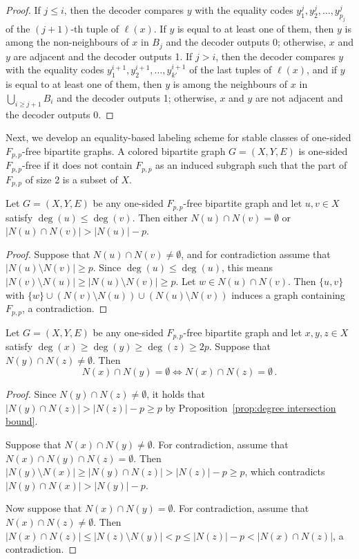 \documentclass{article}
\begin{document}
\begin{proof}
	If $j \leq i$, then the decoder compares $y$ with the equality codes $y^j_1, y^j_2, \ldots, y^j_{p_j}$ of the $(j+1)$-th tuple of $\ell(x)$. If $y$ is equal to at least one of them, then $y$ is among the non-neighbours of $x$ in $B_j$ and the decoder outputs 0; otherwise, $x$ and $y$ are adjacent and the decoder outputs 1.
	If $j > i$, then the decoder compares $y$ with the equality codes $y^{i+1}_1, y^{i+1}_2, \ldots, y^{i+1}_{k'}$ of the last tuples of $\ell(x)$, and
	if $y$ is equal to at least one of them, then $y$ is among the neighbours of $x$ in 
	$\bigcup_{i \geq j+1} B_i$ and the decoder outputs 1; otherwise, $x$ and $y$ are not adjacent and 
	the decoder outputs 0.
\end{proof}


\medskip
\noindent
Next, we develop an equality-based labeling scheme for stable classes of one-sided $F_{p,p}$-free bipartite graphs.
A colored bipartite graph $G = (X,Y,E)$ is one-sided $F_{p,p}$-free if it does not contain $F_{p,p}$
as an induced subgraph such that the part of $F_{p,p}$ of size 2 is a subset of $X$.

\begin{proposition}
\label{prop:degree intersection bound}
Let $G = (X,Y,E)$ be any one-sided $F_{p,p}$-free bipartite graph and let $u,v \in X$ satisfy $\deg(u) \leq \deg(v)$. Then either $N(u) \cap N(v) = \emptyset$ or $|N(u) \cap N(v)| > |N(u)|-p$.
\end{proposition}
\begin{proof}
Suppose that $N(u) \cap N(v) \neq \emptyset$, and for contradiction assume that $|N(u) \setminus
N(v)| \geq p$. Since $\deg(u) \leq \deg(u)$, this means $|N(v) \setminus N(u)| \geq |N(u)
\setminus N(v)| \geq p$. Let $w \in N(u) \cap N(v)$. Then $\{u,v\}$ with $\{w\} \cup (N(v) \setminus
N(u)) \cup (N(u) \setminus N(v))$ induces a graph containing $F_{p,p}$, a contradiction.
\end{proof}

\begin{proposition}
\label{prop:transitive intersections}
Let $G = (X,Y,E)$ be any one-sided $F_{p,p}$-free bipartite graph and let $x,y,z \in X$ satisfy $\deg(x) \geq \deg(y) \geq \deg(z) \geq 2p$. Suppose that $N(y) \cap N(z) \neq \emptyset$. Then
\[
  N(x) \cap N(y) = \emptyset \iff N(x) \cap N(z) = \emptyset \,.
\]
\end{proposition}
\begin{proof}
Since $N(y) \cap N(z) \neq \emptyset$, it holds that $|N(y) \cap N(z)| > |N(z)|-p \geq p$ by
Proposition~\ref{prop:degree intersection bound}.

Suppose that $N(x) \cap N(y) \neq \emptyset$. For contradiction, assume that $N(x) \cap N(y) \cap
N(z) = \emptyset$. Then $|N(y) \setminus N(x)| \geq |N(y) \cap N(z)| > |N(z)|-p \geq p$, which
contradicts $|N(y) \cap N(x)| > |N(y)|-p$.

Now suppose that $N(x) \cap N(y) = \emptyset$. For contradiction, assume that $N(x) \cap N(z) \neq
\emptyset$. Then $|N(x) \cap N(z)| \leq |N(z) \setminus N(y)| < p \leq |N(z)|-p
< |N(x) \cap N(z)|$, a contradiction.
\end{proof}
\end{document}
